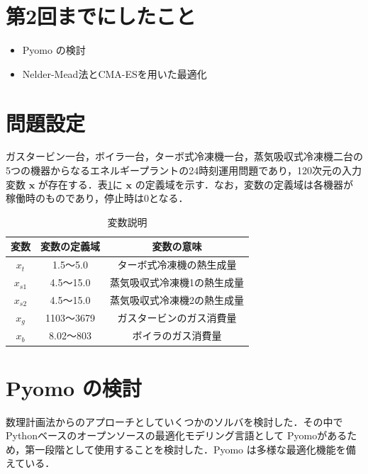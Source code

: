 \documentclass[twocolumn]{jarticle}
\begin{document}

\section{第2回までにしたこと}
\begin{itemize}
    \item Pyomo の検討
    \item Nelder-Mead法とCMA-ESを用いた最適化
\end{itemize}

\section{問題設定}
ガスタービン一台，ボイラ一台，ターボ式冷凍機一台，蒸気吸収式冷凍機二台の5つの機器からなるエネルギープラントの24時刻運用問題であり，120次元の入力変数 $\bm{x}$ が存在する．表\ref{explain_variables}に $\bm{x}$ の定義域を示す．なお，変数の定義域は各機器が稼働時のものであり，停止時は0となる．
\begin{table}[hbtp]
    \caption{変数説明}
    \label{explain_variables}
    \centering
    \begin{tabular}{|c|c|c|}
        \hline
        変数 & 変数の定義域 & 変数の意味 \\
        \hline
        $x_t$ & 1.5〜5.0 & ターボ式冷凍機の熱生成量 \\
        $x_{s1}$ & 4.5〜15.0 & 蒸気吸収式冷凍機1の熱生成量 \\
        $x_{s2}$ & 4.5〜15.0 & 蒸気吸収式冷凍機2の熱生成量 \\
        $x_g$ & 1103〜3679 & ガスタービンのガス消費量 \\
        $x_b$ & 8.02〜803 & ボイラのガス消費量 \\
        \hline
    \end{tabular}
  \end{table}

\section{Pyomo の検討}
数理計画法からのアプローチとしていくつかのソルバを検討した．その中でPythonベースのオープンソースの最適化モデリング言語として Pyomo\cite{bynum2021pyomo}\cite{hart2011pyomo}があるため，第一段階として使用することを検討した．Pyomo は多様な最適化機能を備えている．
\end{document}
